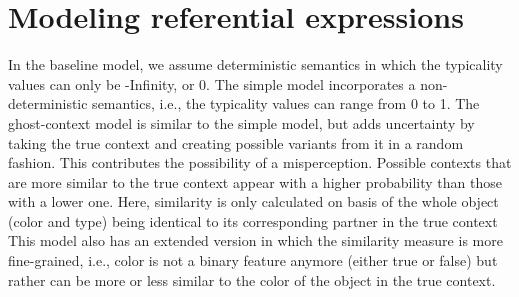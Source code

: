 \documentclass[10pt,letterpaper]{article}
\begin{document}
\section{\bf Modeling referential expressions}

In the baseline model, we assume deterministic semantics in which the typicality values can only be -Infinity, or 0. 
The simple model incorporates a non-deterministic semantics, i.e., the typicality values can range from 0 to 1.
The ghost-context model is similar to the simple model, but adds uncertainty by taking the true context and creating possible variants from it in a random fashion. This contributes the possibility of a misperception. Possible contexts that are more similar to the true context appear with a higher probability than those with a lower one. Here, similarity is only calculated on basis of the whole object (color and type) being identical to its corresponding partner in the true context
This model also has an extended version in which the similarity measure is more fine-grained, i.e., color is not a binary feature anymore (either true or false) but rather can be more or less similar to the color of the object in the true context.
\end{document}

